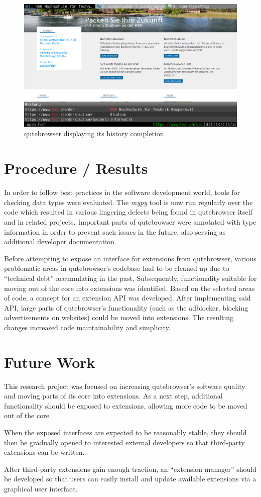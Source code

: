 \begin{figure}[H]
\includegraphics[width=\linewidth]{img/screenshot-intro.png}
\caption{qutebrowser displaying its history completion}
\end{figure}

\section*{Procedure / Results}
In order to follow best practices in the software development world,
tools for checking data types were evaluated. The \emph{mypy} tool is now run
regularly over the code which resulted in various lingering defects
being found in qutebrowser itself and in related projects. Important parts of
qutebrowser were annotated with type information in order to prevent such issues
in the future, also serving as additional developer documentation.

Before attempting to expose an interface for extensions from qutebrowser,
various problematic areas in qutebrowser's codebase had to be cleaned up due to
``technical debt'' accumulating in the past. Subsequently, functionality
suitable for moving out of the core into extensions was identified. Based on
the selected areas of code, a concept for an extension API was developed. After
implementing said API, large parts of qutebrowser's functionality (such as the
adblocker, blocking advertisements on websites) could be moved into extensions.
The resulting changes increased code maintainability and simplicity.

\section*{Future Work}
This research project was focused on increasing qutebrowser's software quality
and moving parts of its core into extensions. As a next step, additional
functionality should be exposed to extensions, allowing more code to be moved
out of the core.

When the exposed interfaces are expected to be reasonably stable,
they should then be gradually opened to interested external developers so that
third-party extensions can be written.

After third-party extensions gain enough traction, an ``extension manager''
should be developed so that users can easily install and update available
extensions via a graphical user interface.